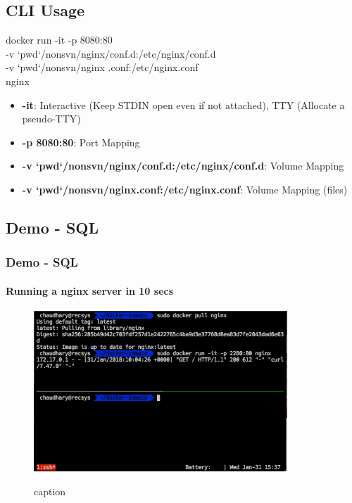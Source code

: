 \documentclass[mathserif,serif]{beamer}
\begin{document}
    \subsection{CLI Usage}\label{subsec:cliUsage}
    \begin{frame}
        \begin{center}
            docker run -it -p 8080:80 \\
            -v `pwd`/nonsvn/nginx/conf.d:/etc/nginx/conf.d \\
            -v `pwd`/nonsvn/nginx .conf:/etc/nginx.conf \\
            nginx
        \end{center}
        \begin{itemize}[<+->]
            \item \textbf{-it}: Interactive (Keep STDIN open even if not attached), TTY (Allocate a pseudo-TTY)
            \item \textbf{-p 8080:80}: Port Mapping
            \item \textbf{-v `pwd`/nonsvn/nginx/conf.d:/etc/nginx/conf.d}: Volume Mapping
            \item \textbf{-v `pwd`/nonsvn/nginx.conf:/etc/nginx.conf}: Volume Mapping (files)
        \end{itemize}
    \end{frame}


    \subsection{Demo - SQL}\label{subsec:demo-Sql}
    \begin{frame}
        \frametitle{Demo - SQL}
        \framesubtitle{Running a nginx server in 10 secs}
        \begin{figure}[h!]
            \centering
            {\includegraphics[height=0.75\textheight,width=0.85\textwidth]{docker-zomato/images/nginx.png}}
            \caption{caption}
        \end{figure}
    \end{frame}
\end{document}
